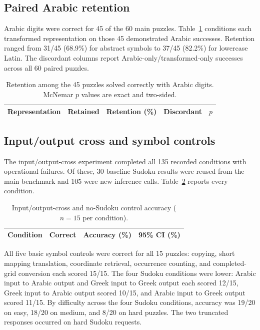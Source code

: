 \documentclass[11pt,a4paper]{article}
\begin{document}
\subsection{Paired Arabic retention}
Arabic digits were correct for 45 of the 60 main puzzles. Table~\ref{tab:retention} conditions each transformed representation on those 45 demonstrated Arabic successes. Retention ranged from 31/45 (68.9\%) for abstract symbols to 37/45 (82.2\%) for lowercase Latin. The discordant columns report Arabic-only/transformed-only successes across all 60 paired puzzles.

\begin{table}[H]
\centering
\small
\caption{Retention among the 45 puzzles solved correctly with Arabic digits. McNemar $p$ values are exact and two-sided.}
\label{tab:retention}
\begin{tabular}{lrrrr}
\toprule
Representation & Retained & Retention (\%) & Discordant & $p$ \\
\midrule
%
\end{tabular}
\end{table}

\subsection{Input/output cross and symbol controls}
The input/output-cross experiment completed all 135 recorded conditions with \InputOutputOperationalFailures{} operational failures. Of these, 30 baseline Sudoku results were reused from the main benchmark and 105 were new inference calls. Table~\ref{tab:input-output} reports every condition.

\begin{table}[H]
\centering
\small
\caption{Input/output-cross and no-Sudoku control accuracy ($n=15$ per condition).}
\label{tab:input-output}
\begin{tabular}{lrrr}
\toprule
Condition & Correct & Accuracy (\%) & 95\% CI (\%) \\
\midrule
%
\end{tabular}
\end{table}

All five basic symbol controls were correct for all 15 puzzles: copying, short mapping translation, coordinate retrieval, occurrence counting, and completed-grid conversion each scored 15/15. The four Sudoku conditions were lower: Arabic input to Arabic output and Greek input to Greek output each scored 12/15, Greek input to Arabic output scored 10/15, and Arabic input to Greek output scored 11/15. By difficulty across the four Sudoku conditions, accuracy was 19/20 on easy, 18/20 on medium, and 8/20 on hard puzzles. The two truncated responses occurred on hard Sudoku requests.
\end{document}
